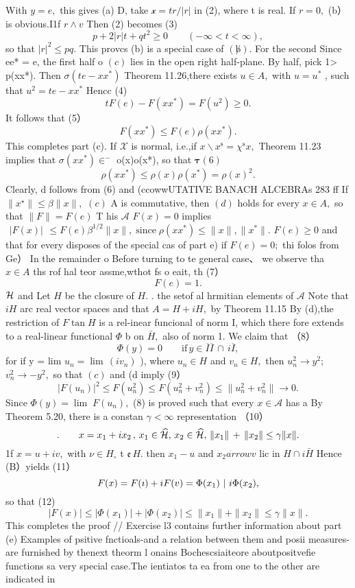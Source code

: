 With $y=e,$ this gives (a) D, take ${\mathcal{x}}=t r/|r|$ in (2), where t is real. If $r=0,$ (b） is obvious.I1f $\scriptstyle{r\wedge v}$ Then (2) becomes (3) $$ p+2|r|t+q t^{2}\geq0\qquad(-\infty<t<\infty), $$ so that $|r|^{2}\leq p q.$ This provcs (b) is a special case of $(\not b).$ For the second Since ee* = e, the first half o $\left(c\right)$ lies in the open right half-plane. By half, pick 1> p(xx*). Then $\sigma(t e-x x^{*})$ Theorem 11.26,there exists $u\in A,$ with $u=u^{*}$ , such that $u^{2}=t e-x x^{*}$ Hencc (4) $$ t F(e)-F(x x^{*})=F(u^{2})\geq0. $$ It follows that (5） $$ F(x x^{*})\leq F(e)\rho(x x^{*}). $$ This completes part (c). If $\scriptstyle{\mathcal{X}}$ is normal, i.e.,if $x\backslash x^{\mathrm{s}}=\chi^{\mathrm{s}}x,$ Theorem 11.23 implies that $\scriptstyle\sigma(x x^{*})\in^{-}$ o(x)o(x*), so that $\mathbf{\tau}(6)$ $$ \rho(x x^{*})\le\rho(x)\rho(x^{*})=\rho(x)^{2}. $$ Clearly, d follows from (6) and (ccowwUTATIVE BANACH ALCEBRAs 283 ff If $\|x^{\star}\|\leq\beta\|x\|,$ $\left(c\right)$ A is commutative, then $(d)$ holds for every $x\in A,$ so that $\|F\|=F(e)$ T his $\mathcal{A}$ $F(x)=0$ implies $\begin{array}{r}{|F(x)|}\end{array}\leq F(e)\beta^{1/2}\|x\|,\;\mathrm{since}\;\rho(x x^{\ast})\leq\|x\|,\|x^{\ast}\|.$ $F(e)\geq0$ and that for every disposes of the special cas of part e) if $F(e)=0;$ thi folos from Ge） In the remainder o Before turning to te general case、 we observe tha $x\in A$ ths rof hal teor assme,wthot fs o eait, th (7） $$ F(e)=1. $$ ${\cal H}$ and Let $H$ be the closure of $H.$ . the setof al hrmitian elements of $\scriptstyle{\mathcal{A}}$ Note that $i H$ arc real vector spaces and that $A=H+i H,$ by Theorem 11.15 By (d),the restriction of $F\tan H$ is a rel-inear funcional of norm I, which there fore extends to a real-linear functional $\Phi$ b on ${\bar{H}},$ also of norm 1. We claim that （8） $$ \Phi(y)=0\qquad\mathrm{if}\,y\in\overline{{{I}}}\overline{{{I}}}\,\cap\,i\overline{{{I}}}, $$ for if y = lim $u_{n}=\operatorname*{lim}\,(i v_{n})$ ), where $u_{n}\in H$ and $v_{n}\in H,$ then $u_{n}^{2}\to y^{2};$ $v_{n}^{2}\to-y^{2},$ so that $\left(c\right)$ and (d imply (9） $$ |F(u_{n})|^{2}\leq F(u_{n}^{2})\leq F(u_{n}^{2}+v_{n}^{2})\leq\|u_{n}^{2}+v_{n}^{2}\|\to0. $$ Since $\Phi(y)=\operatorname*{lim}\;F(u_{n}),$ (8) is proved such that every $x\in{\mathcal{A}}$ has a By Theorem 5.20, there is a constan $\gamma<\infty$ representation （10） $$ .\qquad x=x_{1}+i x_{2}\,,\,x_{1}\in\widehat{\cal H},\,x_{2}\in\widehat{\cal H},\,\|x_{1}\|\,+\,\|x_{2}\|\leq\gamma\|x\|. $$ 1f $x=u+i v,$ with $\nu\in H_{\circ}$ t ${\mathfrak{e}}\,H.$ then $x_{1}-u$ and $x_{2} arrow v$ lic in $H\cap i{\bar{H}}$ Hence (B）yields (11） $$ F(x)=F(\imath)+i F(v)=\Phi(x_{1})\mathrm{\boldmath~\mid~}i\Phi(x_{2}), $$ so that (12) $$ |F(x)|\leq|\Phi(x_{1})|+|\Phi(x_{2})|\leq\|x_{1}\|+\|x_{2}\|\leq\gamma\|x\|. $$ This completes the proof // Exercise l3 contains further information about part (e) Examples of psitive fnctioals-and a relation between them and posii measures-are furnished by thenext theorm l onains Bochescsiaiteore aboutpositvefie functions sa very special case.The ientiatos ta ea from one to the other are indicated in 